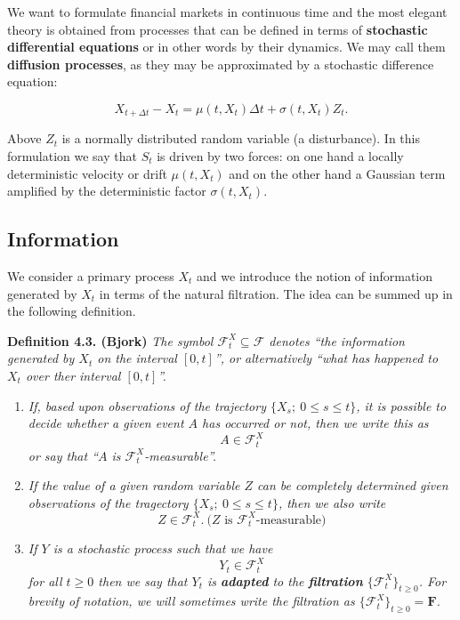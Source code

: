 \documentclass[a4paper,10pt,openany]{book}
\providecommand{\tightlist}{%
 \setlength{\itemsep}{0pt}\setlength{\parskip}{0pt}}
\begin{document}
We want to formulate financial markets in continuous time and the most elegant theory is obtained from processes that can be defined in terms of \textbf{stochastic differential equations} or in other words by their dynamics. We may call them \textbf{diffusion processes}, as they may be approximated by a stochastic difference equation:

\[
X_{t+\Delta t}-X_t=\mu(t,X_t)\Delta t+\sigma(t,X_t)Z_t.\tag{4.1}
\]

Above \(Z_t\) is a normally distributed random variable (a disturbance). In this formulation we say that \(S_t\) is driven by two forces: on one hand a locally deterministic velocity or drift \(\mu(t,X_t)\) and on the other hand a Gaussian term amplified by the deterministic factor \(\sigma(t,X_t)\).

\hypertarget{information}{%
\subsection{Information}\label{information}}

We consider a primary process \(X_t\) and we introduce the notion of information generated by \(X_t\) in terms of the natural filtration. The idea can be summed up in the following definition.

\textbf{Definition 4.3. (Bjork)} \emph{The symbol \(\mathcal{F}^X_t\subseteq\mathcal{F}\) denotes ``the information generated by \(X_t\) on the interval \([0,t]\)'', or alternatively ``what has happened to \(X_t\) over ther interval \([0,t]\)''.}

\begin{enumerate}
\def\labelenumi{\arabic{enumi}.}
\tightlist
\item
  \emph{If, based upon observations of the trajectory \(\{X_s;\ 0\le s\le t\}\), it is possible to decide whether a given event \(A\) has occurred or not, then we write this as}
  \[
    A\in\mathcal{F}^X_t
    \]
  \emph{or say that ``\(A\) is \(\mathcal{F}^X_t\)-measurable''.}
\item
  \emph{If the value of a given random variable \(Z\) can be completely determined given observations of the tragectory \(\{X_s;\ 0\le s\le t\}\), then we also write}
  \[
    Z\in\mathcal{F}^X_t.\ \text{(}Z\text{ is }\mathcal{F}^X_t\text{-measurable)}
    \]
\item
  \emph{If \(Y\) is a stochastic process such that we have}
  \[
    Y_t\in\mathcal{F}^X_t
    \]
  \emph{for all \(t\ge0\) then we say that \(Y_t\) is \textbf{adapted} to the \textbf{filtration} \(\{\mathcal{F}^X_t\}_{t\ge 0}\). For brevity of notation, we will sometimes write the filtration as \(\{\mathcal{F}^X_t\}_{t\ge 0}=\mathbf{F}\).}
\end{enumerate}
\end{document}
